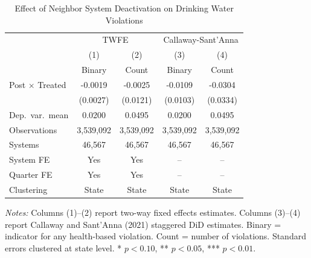 \begin{table}[t]
\centering
\caption{Effect of Neighbor System Deactivation on Drinking Water Violations}
\label{tab:main}
\begin{threeparttable}
\begin{tabular}{lcccc}
\hline\hline
 & \multicolumn{2}{c}{TWFE} & \multicolumn{2}{c}{Callaway-Sant'Anna} \\
 & (1) & (2) & (3) & (4) \\
 & Binary & Count & Binary & Count \\
\hline
Post $\times$ Treated & -0.0019 & -0.0025 & -0.0109 & -0.0304 \\
 & (0.0027) & (0.0121) & (0.0103) & (0.0334) \\
[0.5em]
Dep.\ var.\ mean & 0.0200 & 0.0495 & 0.0200 & 0.0495 \\
Observations & 3,539,092 & 3,539,092 & 3,539,092 & 3,539,092 \\
Systems & 46,567 & 46,567 & 46,567 & 46,567 \\
System FE & Yes & Yes & -- & -- \\
Quarter FE & Yes & Yes & -- & -- \\
Clustering & State & State & State & State \\
\hline\hline
\end{tabular}
\begin{tablenotes}[flushleft]\small
\item \textit{Notes:} Columns (1)--(2) report two-way fixed effects estimates. Columns (3)--(4) report Callaway and Sant'Anna (2021) staggered DiD estimates. Binary = indicator for any health-based violation. Count = number of violations. Standard errors clustered at state level. * $p<0.10$, ** $p<0.05$, *** $p<0.01$.
\end{tablenotes}
\end{threeparttable}
\end{table}

